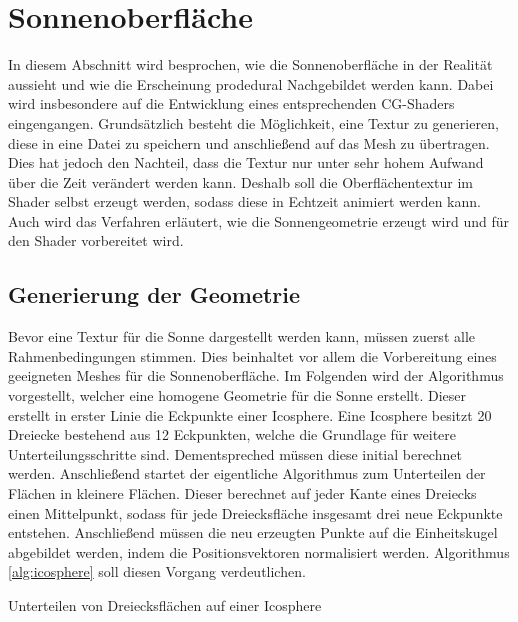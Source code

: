 \section{Sonnenoberfläche}
In diesem Abschnitt wird besprochen, wie die Sonnenoberfläche in der Realität
aussieht und wie die Erscheinung prodedural Nachgebildet werden kann. Dabei
wird insbesondere auf die Entwicklung eines entsprechenden CG-Shaders
eingengangen. Grundsätzlich besteht die Möglichkeit, eine Textur zu
generieren, diese in eine Datei zu speichern und anschließend auf das Mesh zu
übertragen. Dies hat jedoch den Nachteil, dass die Textur nur unter sehr
hohem Aufwand über die Zeit verändert werden kann. Deshalb soll die
Oberflächentextur im Shader selbst erzeugt werden, sodass diese in Echtzeit
animiert werden kann. Auch wird das Verfahren erläutert, wie die
Sonnengeometrie erzeugt wird und für den Shader vorbereitet wird.

\subsection{Generierung der Geometrie} 
Bevor eine Textur für die Sonne dargestellt werden kann, müssen zuerst alle
Rahmenbedingungen stimmen. Dies beinhaltet vor allem die Vorbereitung eines
geeigneten Meshes für die Sonnenoberfläche. Im Folgenden wird der Algorithmus
vorgestellt, welcher eine homogene Geometrie für die Sonne erstellt. Dieser
erstellt in erster Linie die Eckpunkte einer Icosphere. Eine Icosphere
besitzt 20 Dreiecke bestehend aus 12 Eckpunkten, welche die Grundlage für
weitere Unterteilungsschritte sind. Dementspreched müssen diese initial
berechnet werden. Anschließend startet der eigentliche Algorithmus zum
Unterteilen der Flächen in kleinere Flächen. Dieser berechnet auf jeder Kante
eines Dreiecks einen Mittelpunkt, sodass für jede Dreiecksfläche insgesamt
drei neue Eckpunkte entstehen. Anschließend müssen die neu erzeugten Punkte
auf die Einheitskugel abgebildet werden, indem die Positionsvektoren
normalisiert werden. Algorithmus \ref{alg:icosphere} soll diesen Vorgang
verdeutlichen.

\begin{algorithm}
  \caption{Unterteilen von Dreiecksflächen auf einer Icosphere}
  \label{alg:icosphere}
  \SetAlgoLined


  \BlankLine
\end{algorithm}

